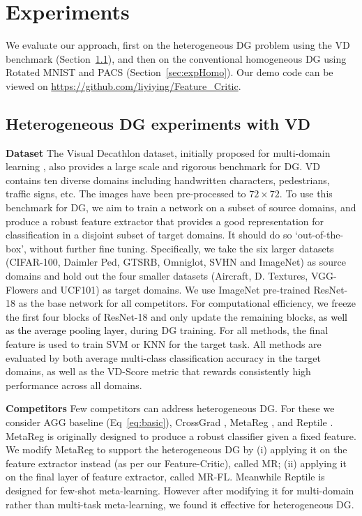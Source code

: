 \documentclass{article}
\newcommand{\modelname}{Feature-Critic}
\newcommand{\keypoint}[1]{\vspace{0.0cm}\noindent\textbf{#1}\quad}
\newcommand{\nice}[1]{\textcolor{black}{#1}}
\begin{document}
\section{Experiments}
We evaluate our approach, first on the heterogeneous DG problem using the VD benchmark (Section~\ref{sec:expHetero}), and then on the conventional homogeneous DG using Rotated MNIST and PACS (Section~\ref{sec:expHomo}). Our demo code can be viewed on \url{https://github.com/liyiying/Feature\_Critic}.

\subsection{Heterogeneous DG experiments with VD}\label{sec:expHetero}
\keypoint{Dataset} The Visual Decathlon dataset, initially proposed for multi-domain learning \cite{Rebuffi17}, also provides a large scale and rigorous benchmark for DG. VD contains ten diverse domains including handwritten characters, pedestrians, traffic signs, etc. The images have been pre-processed to $72\times 72$. To use this benchmark for DG, we aim to train a network on a subset of source domains, and produce a robust feature extractor that provides a good representation for classification in a disjoint subset of target domains. It should do so `out-of-the-box', without further fine tuning. Specifically, we take the six larger datasets (CIFAR-100, Daimler Ped, GTSRB, Omniglot, SVHN and ImageNet) as source domains and hold out the four smaller datasets (Aircraft, D. Textures, VGG-Flowers and UCF101) as target domains. We use ImageNet pre-trained ResNet-18 \cite{He16} as the base network for all competitors. For computational efficiency, we freeze the first four blocks of ResNet-18 and only update the remaining blocks\nice{, as well as the average pooling layer,} during DG training. For all methods, the final feature is used to train SVM or KNN for the target task. All methods are evaluated by both average multi-class classification accuracy in the target domains, as well as the VD-Score metric \cite{Rebuffi17} that rewards consistently high performance across all domains.

\keypoint{Competitors} Few competitors can address heterogeneous DG. For these we consider AGG baseline (Eq~\ref{eq:basic}), CrossGrad \cite{Shankar18}, MetaReg \cite{Balaji18}, and Reptile \cite{nichol2018reptileFOML}. MetaReg is originally designed to produce a robust classifier given a fixed feature. We modify MetaReg to support the heterogeneous DG by (i) applying it on the feature extractor instead (as per our \modelname), called MR; (ii) applying it on the final layer of feature extractor, called MR-FL. Meanwhile Reptile is designed for few-shot meta-learning. However after modifying it for multi-domain rather than multi-task meta-learning, we found it effective for heterogeneous DG.
\end{document}
